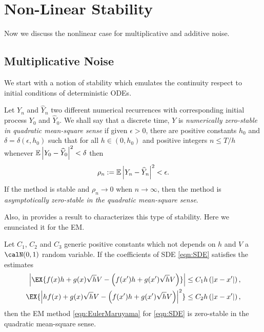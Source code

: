 \section*{Non-Linear Stability}	
	Now we discuss the nonlinear case for multiplicative and additive noise. 
	\subsection*{Multiplicative Noise}
	We start with a notion of stability	which emulates the continuity respect to initial conditions of deterministic 
	ODEs.
	\begin{dfn}\label{dfn:SNMS}
		Let $Y_n$ and $\widehat{Y}_n$ two different numerical recurrences  with
		corresponding initial process  $Y_0$ and $\widehat{Y}_0$. We shall say that a
		discrete time, $Y$ is \emph{numerically zero-stable in quadratic mean-square sense} if given
		$\epsilon >0$, there  are positive constants $h_0$ and $\delta=\delta(\epsilon,h_0)$
		such that for all $h\in(0,h_0)$ and positive integers $n \leq T/h$ whenever
		$\mathbb{E}\left|Y_0-\widehat{Y}_0\right|^2<\delta$ then
		\begin {eqnarray}\label{eqn:SNMS}
		\rho_n :=
		\mathbb{E}\left|Y_n-\widehat{Y}_{n}\right|^2<\epsilon .
	\end{eqnarray}
	If the method is stable and $\rho_n \to 0$ when $n\to \infty$, then the method is
	\emph{asymptotically zero-stable in the quadratic mean-square sense}.
\end{dfn}
Also, in \cite{Baker2000a} provides a result to characterizes this type of stability. Here we
enunciated it for the EM.
\begin{thm}
	Let $C_1$, $C_2$ and $C_3$ generic positive constants which not depends on $h$ and $V$ a
	$\calN(0,1)$ random variable. 
	If the coefficients of  SDE \eqref{eqn:SDE} satisfies the estimates
	\begin{align*}
		\left|\EX{
			f(x) h +  g(x)\sqrt{h}V -
			\left(
				f(x') h + g(x')\sqrt{h}V
			\right)}	
		\right| 
		&\leq C_1h \left(|x - x'| \right), \\
		\EX{\left|
				hf(x)+g(x)\sqrt{h}V -
				\left(
				 f(x') h + g(x')\sqrt{h}V
				\right)	
			\right|^2}
			&\leq C_2 h \left(|x - x'| \right),
	\end{align*}
	then the EM method \eqref{eqn:EulerMaruyama} for \eqref{eqn:SDE} is zero-stable in the quadratic mean-square sense.
\end{thm}
